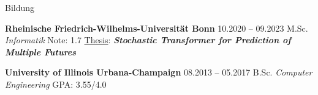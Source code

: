 \begin{rubric}{Bildung}


\entry*[] \textbf{Rheinische Friedrich-Wilhelms-Universität Bonn} \hfill 10.2020 -- 09.2023  \newline
  M.Sc. \emph{Informatik}  \hfill Note:  1.7 \newline %
  \underline{Thesis}:  \hspace*{5mm} \textit{\textbf{Stochastic Transformer for Prediction of Multiple Futures}} \newline 

\entry*[] \textbf{University of Illinois Urbana-Champaign} \hfill 08.2013 -- 05.2017  \newline
 B.Sc. \emph{Computer Engineering} \hfill GPA: 3.55/4.0 \newline %



\end{rubric}